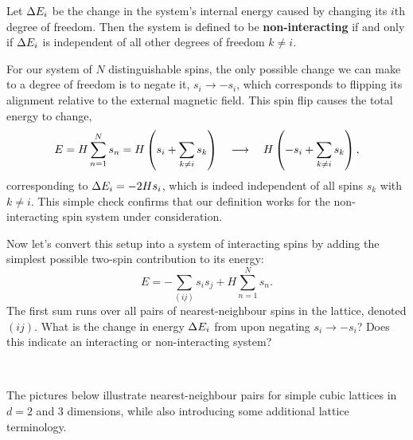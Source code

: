 \begin{shaded}
  Let $\Delta E_i$ be the change in the system's internal energy caused by changing its $i$th degree of freedom.
  Then the system is defined to be \textbf{non-interacting} if and only if $\Delta E_i$ is independent of all other degrees of freedom $k \ne i$.
\end{shaded}

For our system of $N$ distinguishable spins, the only possible change we can make to a degree of freedom is to negate it, $s_i \to -s_i$, which corresponds to flipping its alignment relative to the external magnetic field.
This spin flip causes the total energy to change,
\begin{equation*}
  E = H \sum_{n = 1}^N s_n = H\left(s_i + \sum_{k \ne i} s_k\right) \quad \longrightarrow \quad H\left(-s_i + \sum_{k \ne i} s_k\right),
\end{equation*}
corresponding to $\Delta E_i = -2H s_i$, which is indeed independent of all spins $s_k$ with $k \ne i$.
This simple check confirms that our definition works for the non-interacting spin system under consideration.

Now let's convert this setup into a system of interacting spins by adding the simplest possible two-spin contribution to its energy:
\begin{equation}
  \label{eq:Ising_energy}
  E = -\sum_{(ij)} s_i s_j + H \sum_{n = 1}^N s_n.
\end{equation}
The first sum runs over all pairs of nearest-neighbour spins in the lattice, denoted $(ij)$.
What is the change in energy $\Delta E_i$ from  upon negating $s_i \to -s_i$?
Does this indicate an interacting or non-interacting system?
\begin{mdframed}
  \ \\[100 pt]
\end{mdframed}
The pictures below illustrate nearest-neighbour pairs for simple cubic lattices in $d = 2$ and $3$ dimensions, while also introducing some additional lattice terminology.

